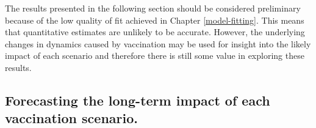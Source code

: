 \documentclass[11pt,twoside]{bristolthesis}
\begin{document}
  The results presented in the following section should be considered preliminary because of the low quality of fit achieved in Chapter \ref{model-fitting}. This means that quantitative estimates are unlikely to be accurate. However, the underlying changes in dynamics caused by vaccination may be used for insight into the likely impact of each scenario and therefore there is still some value in exploring these results.
  
  \hypertarget{forecasting-the-long-term-impact-of-each-vaccination-scenario.}{%
  \subsection{Forecasting the long-term impact of each vaccination scenario.}\label{forecasting-the-long-term-impact-of-each-vaccination-scenario.}}
  
\end{document}
